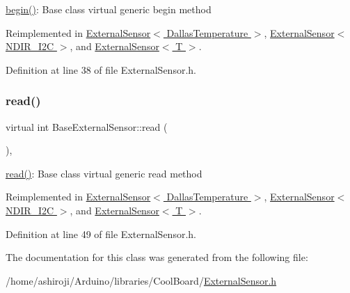 \hyperlink{class_base_external_sensor_a87d132803d4f4fdd4e66332809f0c9a0}{begin()}\+: Base class virtual generic begin method 

Reimplemented in \hyperlink{class_external_sensor_3_01_dallas_temperature_01_4_ac5275129b05e2ff8df45d5b222a661d9}{External\+Sensor$<$ Dallas\+Temperature $>$}, \hyperlink{class_external_sensor_3_01_n_d_i_r___i2_c_01_4_ac6f3614d94968ef0cc11b2b4d69cef03}{External\+Sensor$<$ N\+D\+I\+R\+\_\+\+I2\+C $>$}, and \hyperlink{class_external_sensor_ab6fe1379d55b656a048e0fba1e0a32e6}{External\+Sensor$<$ T $>$}.



Definition at line 38 of file External\+Sensor.\+h.

\mbox{\label{class_base_external_sensor_a7e0a98f350148d7645031315657aa5ec}} 
\subsubsection{\texorpdfstring{read()}{read()}}
{\footnotesize\ttfamily virtual int Base\+External\+Sensor\+::read (\begin{DoxyParamCaption}{ }\end{DoxyParamCaption})\hspace{0.3cm}{\ttfamily [inline]}, {\ttfamily [virtual]}}

\hyperlink{class_base_external_sensor_a7e0a98f350148d7645031315657aa5ec}{read()}\+: Base class virtual generic read method 

Reimplemented in \hyperlink{class_external_sensor_3_01_dallas_temperature_01_4_a127ead06440ec972c22db2abeb8e2b51}{External\+Sensor$<$ Dallas\+Temperature $>$}, \hyperlink{class_external_sensor_3_01_n_d_i_r___i2_c_01_4_add67f5ecaf47d2ee675e8299aee7322d}{External\+Sensor$<$ N\+D\+I\+R\+\_\+\+I2\+C $>$}, and \hyperlink{class_external_sensor_a6dbf2d6b1c183740ce0f153d6e43ccb2}{External\+Sensor$<$ T $>$}.



Definition at line 49 of file External\+Sensor.\+h.



The documentation for this class was generated from the following file\+:\begin{DoxyCompactItemize}
\item 
/home/ashiroji/\+Arduino/libraries/\+Cool\+Board/\hyperlink{_external_sensor_8h}{External\+Sensor.\+h}\end{DoxyCompactItemize}
